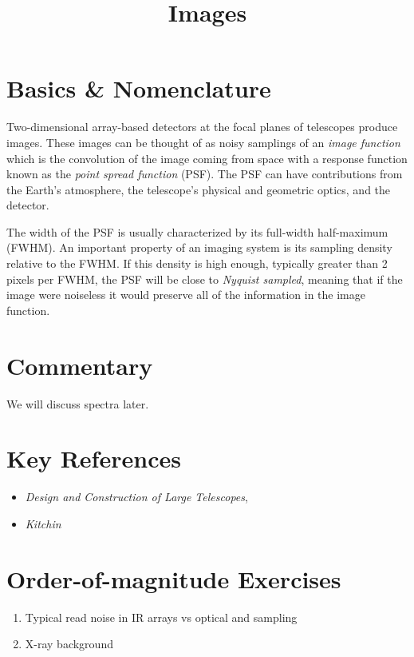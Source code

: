 \title{\bf Images}

\section{Basics \& Nomenclature}

Two-dimensional array-based detectors at the focal planes of
telescopes produce images. These images can be thought of as noisy
samplings of an {\it image function} which is the convolution of the
image coming from space with a response function known as the {\it
  point spread function} (PSF). The PSF can have contributions from
the Earth's atmosphere, the telescope's physical and geometric optics,
and the detector.

The width of the PSF is usually characterized by its full-width
half-maximum (FWHM). An important property of an imaging system is its
sampling density relative to the FWHM. If this density is high enough,
typically greater than 2 pixels per FWHM, the PSF will be close to
{\it Nyquist sampled}, meaning that if the image were noiseless it
would preserve all of the information in the image function.



\section{Commentary}

We will discuss spectra later. 

\section{Key References}

\begin{itemize}
  \item
    {\it Design and Construction of Large Telescopes},
      \citet{bely}
  \item
    {\it Kitchin}
\end{itemize}

\citet{gunn06a}

\section{Order-of-magnitude Exercises}

\begin{enumerate} 
\item Typical read noise in IR arrays vs optical and sampling
\item X-ray background
\end{enumerate} 

